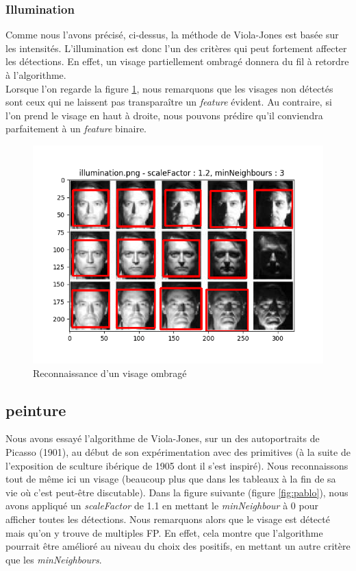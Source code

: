 \documentclass[a4paper,11pt]{article}
\begin{document}
	\subsubsection{Illumination}

	    Comme nous l'avons précisé, ci-dessus, la méthode de Viola-Jones est basée sur les
	    intensités. L'illumination est donc l'un des critères qui peut fortement affecter les
	    détections. En effet, un visage partiellement ombragé donnera du fil à retordre à
	    l'algorithme. \\

	    Lorsque l'on regarde la figure \ref{fig:illumination}, nous remarquons que les visages
	    non détectés sont ceux qui ne laissent pas transparaître un \textit{feature} évident. Au
	    contraire, si l'on prend le visage en haut à droite, nous pouvons prédire qu'il
	    conviendra parfaitement à un \textit{feature} binaire.


	    \begin{figure}[H]
	        \begin{center}
		   \includegraphics[scale = 0.6]{images/illumination_1,2_3.png}
		   \caption{Reconnaissance d'un visage ombragé}
		   \label{fig:illumination}
	        \end{center}
	    \end{figure}

    \subsection{peinture}

	Nous avons essayé l'algorithme de Viola-Jones, sur un des autoportraits de Picasso (1901), au
	début de son expérimentation avec des primitives (à la suite de l'exposition de sculture
	ibérique de 1905 dont il s'est inspiré). Nous reconnaissons tout de même ici un visage
	(beaucoup plus que dans les tableaux à la fin de sa vie où c'est peut-être discutable).
	Dans la figure suivante (figure \ref{fig:pablo}), nous avons appliqué un
	\textit{scaleFactor} de 1.1 en mettant le \textit{minNeighbour} à 0 pour afficher toutes les
	détections. Nous remarquons alors que le visage est détecté mais qu'on y trouve de multiples
	FP. En effet, cela montre que l'algorithme pourrait être amélioré au niveau du choix des
	positifs, en mettant un autre critère que les \textit{minNeighbours}.
\end{document}
